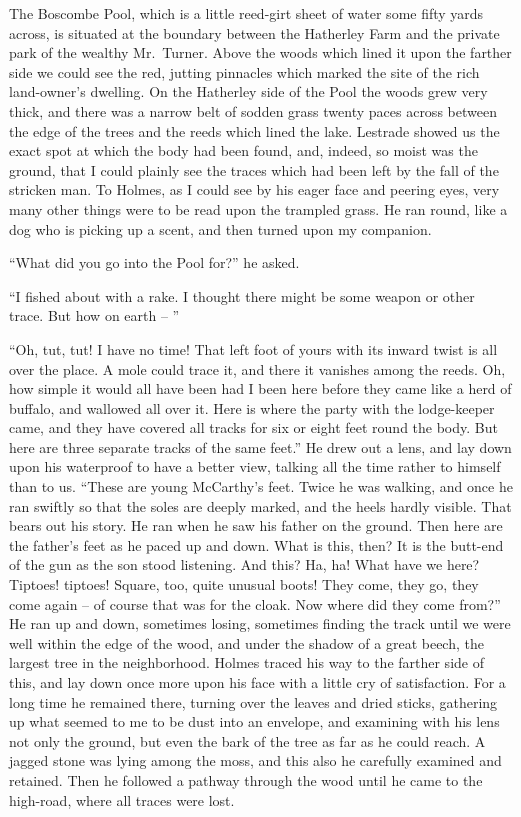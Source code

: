 The Boscombe Pool, which is a little reed-girt sheet of
water some fifty yards across, is situated at the boundary between
the Hatherley Farm and the private park of the wealthy
Mr.~Turner. Above the woods which lined it upon the farther
side we could see the red, jutting pinnacles which marked the
site of the rich land-owner’s dwelling. On the Hatherley side
of the Pool the woods grew very thick, and there was a narrow
belt of sodden grass twenty paces across between the edge
of the trees and the reeds which lined the lake. Lestrade
showed us the exact spot at which the body had been found,
and, indeed, so moist was the ground, that I could plainly see
the traces which had been left by the fall of the stricken man.
To Holmes, as I could see by his eager face and peering eyes,
very many other things were to be read upon the trampled
grass. He ran round, like a dog who is picking up a scent,
and then turned upon my companion.

“What did you go into the Pool for?” he asked.

“I fished about with a rake. I thought there might be some
weapon or other trace. But how on earth -- ”

“Oh, tut, tut! I have no time! That left foot of yours
with its inward twist is all over the place. A mole could trace
it, and there it vanishes among the reeds. Oh, how simple it
would all have been had I been here before they came like a
herd of buffalo, and wallowed all over it. Here is where the
party with the lodge-keeper came, and they have covered all
tracks for six or eight feet round the body. But here are
three separate tracks of the same feet.” He drew out a lens,
and lay down upon his waterproof to have a better view, talking
all the time rather to himself than to us. “These are
young McCarthy’s feet. Twice he was walking, and once he
ran swiftly so that the soles are deeply marked, and the heels
hardly visible. That bears out his story. He ran when he
saw his father on the ground. Then here are the father’s feet
as he paced up and down. What is this, then? It is the butt-end
of the gun as the son stood listening. And this? Ha,
ha! What have we here? Tiptoes! tiptoes! Square, too,
quite unusual boots! They come, they go, they come again -- of
course that was for the cloak. Now where did they come
from?” He ran up and down, sometimes losing, sometimes
finding the track until we were well within the edge of the
wood, and under the shadow of a great beech, the largest tree
in the neighborhood. Holmes traced his way to the farther
side of this, and lay down once more upon his face with a little
cry of satisfaction. For a long time he remained there,
turning over the leaves and dried sticks, gathering up what
seemed to me to be dust into an envelope, and examining
with his lens not only the ground, but even the bark of the
tree as far as he could reach. A jagged stone was lying
among the moss, and this also he carefully examined and retained.
Then he followed a pathway through the wood until
he came to the high-road, where all traces were lost.

